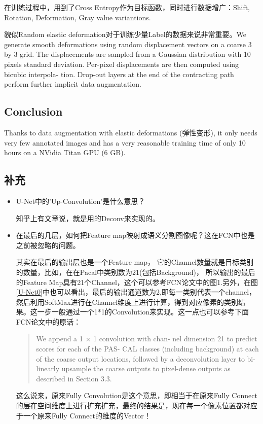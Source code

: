 在训练过程中，用到了Cross Entropy作为目标函数，同时进行数据增广：Shift, Rotation, Deformation, Gray value variantions.

貌似Random elastic deformation对于训练少量Label的数据来说非常重要。We generate smooth
deformations using random displacement vectors on a coarse 3 by 3 grid. The
displacements are sampled from a Gaussian distribution with 10 pixels standard
deviation. Per-pixel displacements are then computed using bicubic interpola-
tion. Drop-out layers at the end of the contracting path perform further implicit
data augmentation.


\subsection{Conclusion}

Thanks to data augmentation with elastic deformations (弹性变形), it only needs very few annotated images and has a very reasonable training time of only 10 hours on a NVidia Titan GPU (6 GB).

\subsection{补充}
\begin{itemize}
\item U-Net中的'Up-Convolution'是什么意思？

知乎上有文章说，就是用的Deconv来实现的。

\item 在最后的几层，如何把Feature map映射成语义分割图像呢？这在FCN\cite{Fcn2014}中也是之前被忽略的问题。

其实在最后的输出层也是一个Feature map， 它的Channel数量就是目标类别的数量，比如，在在Pacal中类别数为21(包括Background)， 所以输出的最后的Feature Map具有21个Channel，这个可以参考FCN论文中的图1.另外，在图\ref{U-Net0}中也可以看出，最后的输出通道数为2,即每一类别代表一个channel，然后利用SoftMax进行在Channel维度上进行计算，得到对应像素的类别结果。这一步一般通过一个1*1的Convolution来实现。这一点也可以参考下面FCN论文中的原话：
\begin{quote}
	We append a 1 × 1 convolution with chan-
	nel dimension 21 to predict scores for each of the PAS-
	CAL classes (including background) at each of the coarse
	output locations, followed by a deconvolution layer to bi-
	linearly upsample the coarse outputs to pixel-dense outputs
	as described in Section 3.3.
\end{quote}

这么说来，原来Fully Convolution是这个意思，即相当于在原来Fully Connect的层在空间维度上进行扩充扩充，最终的结果是，现在每一个像素位置都对应于一个原来Fully Connect的维度的Vector！
\end{itemize}

